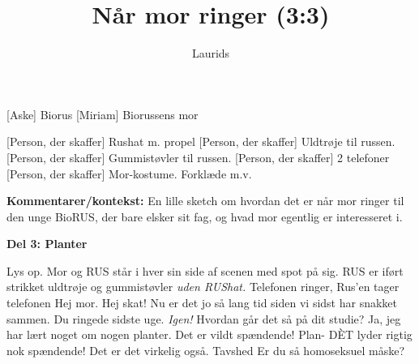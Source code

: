 \documentclass[a4paper,11pt]{article}
\title{Når mor ringer (3:3)}
\author{Laurids}
\begin{document}
\maketitle

\begin{roles}
    [Aske] Biorus
    [Miriam] Biorussens mor
\end{roles}

\begin{props}
    [Person, der skaffer] Rushat m. propel
    [Person, der skaffer] Uldtrøje til russen.
    [Person, der skaffer] Gummistøvler til russen.
    [Person, der skaffer] 2 telefoner
    [Person, der skaffer] Mor-kostume. Forklæde m.v.
\end{props}

\textbf{Kommentarer/kontekst:}
En lille sketch om hvordan det er når mor ringer til den unge BioRUS, der bare elsker sit fag, og hvad mor egentlig er interesseret i.




\begin{sketch}

\begin{center}
\textbf{Del 3: Planter}
\end{center}
\scene Lys op.
\scene Mor og RUS står i hver sin side af scenen med spot på sig. RUS er iført strikket uldtrøje og gummistøvler \emph{uden RUShat.}
\scene Telefonen ringer, Rus'en tager telefonen
 Hej mor.
 Hej skat! Nu er det jo så lang tid siden vi sidst har snakket sammen.
 Du ringede sidste uge. \emph{Igen!}
 Hvordan går det så på dit studie?
 Ja, jeg har lært noget om nogen planter. Det er vildt spændende! Plan-
 DÈT lyder rigtig nok spændende!
 Det er det virkelig også.
\scene Tavshed
 Er du så homoseksuel måske?



\end{sketch}
\end{document}
